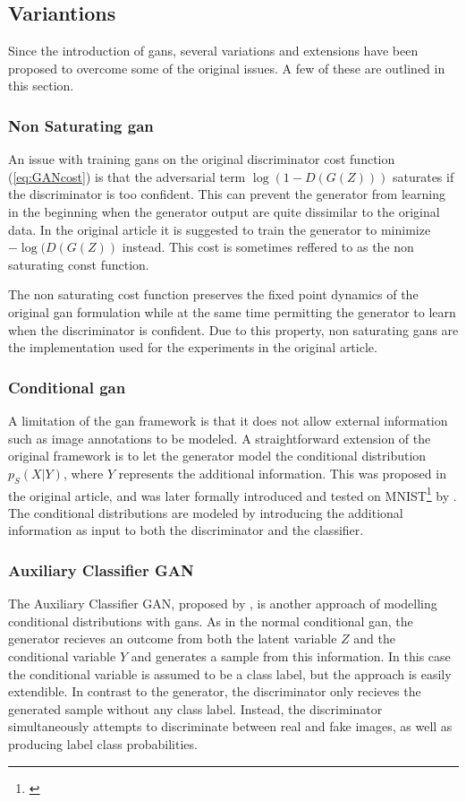 \subsection{Variantions}
Since the introduction of \acrshort{gans}, several variations and extensions have been proposed to overcome some of the original issues. A few of these are outlined in this section.

\subsubsection{Non Saturating \acrshort{gan}} 
An issue with training \acrshort{gans} on the original discriminator cost function (\ref{eq:GANcost}) is that the adversarial term $\log(1-D(G(Z)))$ saturates if the discriminator is too confident. This can prevent the generator from learning in the beginning when the generator output are quite dissimilar to the original data. In the original article it is suggested to train the generator to minimize $-\log(D(G(Z))$ instead. This cost is sometimes reffered to as the non saturating const function.

The non saturating cost function preserves the fixed point dynamics of the original \acrshort{gan} formulation while at the same time permitting the generator to learn when the discriminator is confident. Due to this property, non saturating \acrshort{gans} are the implementation used for the experiments in the original article.

\subsubsection{Conditional \acrshort{gan}}
A limitation of the \acrshort{gan} framework is that it does not allow external information such as image annotations to be modeled. A straightforward extension of the original framework is to let the generator model the conditional distribution $p_S(X|Y)$, where $Y$ represents the additional information. This was proposed in the original article, and was later formally introduced and tested on MNIST\footnote{\textcite{lecun2010mnist}} by \textcite{mirza2014conditional}. The conditional distributions are modeled by introducing the additional information as input to both the discriminator and the classifier.


\subsubsection{Auxiliary Classifier GAN}
The Auxiliary Classifier GAN, proposed by \textcite{odena2016conditional}, is another approach of modelling conditional distributions with \acrshort{gans}. As in the normal conditional \acrshort{gan}, the generator recieves an outcome from both the latent variable $Z$ and the conditional variable $Y$ and generates a sample from this information. In this case the conditional variable is assumed to be a class label, but the approach is easily extendible. In contrast to the generator, the discriminator only recieves the generated sample without any class label. Instead, the discriminator simultaneously attempts to discriminate between real and fake images, as well as producing label class probabilities.

